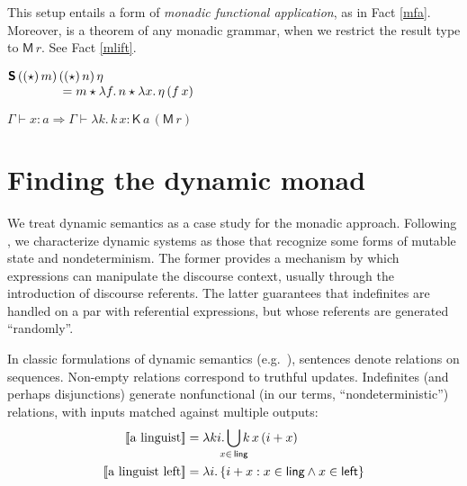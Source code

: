   This setup entails a form of \emph{monadic functional application}, as in Fact \ref{mfa}. Moreover,  is a theorem of any monadic grammar, when we restrict the result type to $\textsf{M}\,r$. See Fact \ref{mlift}.%
	\begin{fact}\label{mfa}%
		$\begin{array}[t]{@{}r@{}l@{}}
			\bsf{S}\,((\star)\,m)\,&((\star)\,n)\,\eta 
			\\
			&{}= m \star \lambda f.\,n \star \lambda x.\,\eta\,(f\,x)%
			\\
		\end{array}$%
	\end{fact}
	\begin{fact}\label{mlift}%
    $\Gamma \vdash x : a \Rightarrow \Gamma \vdash \lambda k.\,k\,x : \textsf{K}\,a\,(\textsf{M}\,r)$%
	\end{fact}
	

\section{Finding the dynamic monad}
  We treat dynamic semantics as a case study for the monadic approach. Following \citealt{Shan:2001}, we characterize dynamic systems as those that recognize some forms of mutable state and nondeterminism. The former provides a mechanism by which expressions can manipulate the discourse context, usually through the introduction of discourse referents. The latter guarantees that indefinites are handled on a par with referential expressions, but whose referents are generated ``randomly''.%
	
  In classic formulations of dynamic semantics (e.g.~\citealt{Heim:1982, Kamp:1981, GroenendijkStokhof:1991, Dekker:1994}), sentences denote relations on sequences. Non-empty relations correspond to truthful updates. Indefinites (and perhaps disjunctions) generate nonfunctional (in our terms, ``nondeterministic'') relations, with inputs matched against multiple outputs:%
  \begin{align}\notag%
	    \sv{\text{a linguist}} &= \lambda ki.\displaystyle\bigcup_{\mathclap{x\in\,\textsf{ling}}}k\,x\,(i + x)%
		\\
		\sv{\text{a linguist left}} &= \lambda i.\,\{i + x : x \in \textsf{ling} \wedge x \in \textsf{left}\}%
    \notag
  \end{align}%
  
